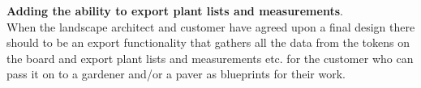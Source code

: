 \textbf{Adding the ability to export plant lists and measurements}.\\
When the landscape architect and customer have agreed upon a final design there should to be an export functionality that gathers all the data from the tokens on the board and export plant lists and measurements etc. for the customer who can pass it on to a gardener and/or a paver as blueprints for their work.
